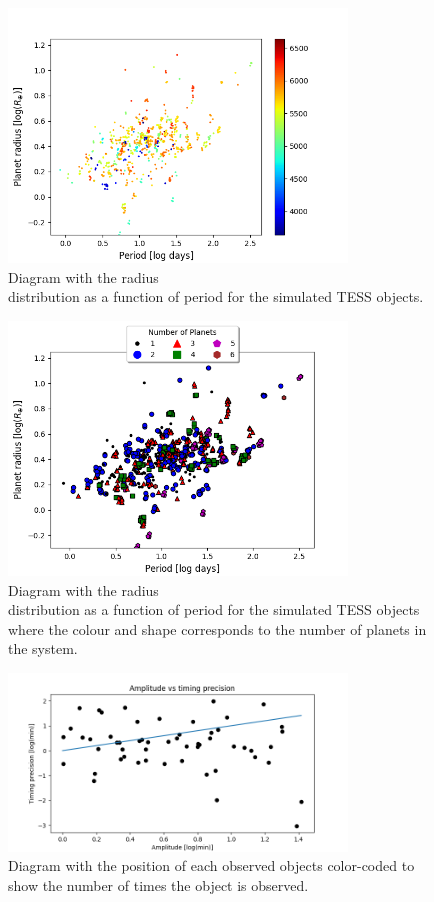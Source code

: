 \documentclass[12pt]{report}
\begin{document}
\begin{figure}
 	 \centering
 	 \includegraphics[width=9cm]{img/R_P-plot_effTemp_cut-off.png}
 	 \caption{Diagram with the radius \\distribution as a function of period for the simulated TESS objects.}
 	 \label{fig:RP_plot_temp}
\end{figure}
\begin{figure}
 	 \centering
 	 \includegraphics[width=9cm]{img/R_P-plot_numP1.png}
 	 \caption{Diagram with the radius \\distribution as a function of period for the simulated TESS objects where the colour and shape corresponds to the number of planets in the system.}
 	 \label{fig:RP_plot_multi}
\end{figure}

\begin{figure}
 	 \centering
	  \includegraphics[width=9cm]{img/ampErrorLog.png}
	  \caption{Diagram with the position of each observed objects color-coded to show the number of times the object is observed.}
	 \label{fig:pos_num_obs}
\end{figure}
\end{document}
